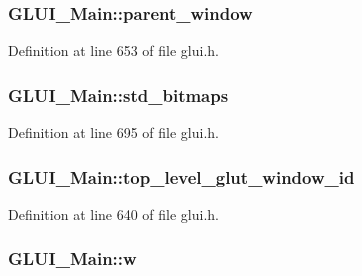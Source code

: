 \hypertarget{class_g_l_u_i___main_a70e6e1ec266281f272954fcc42f85087}{
\subsubsection[{parent\+\_\+window}]{ G\+L\+U\+I\+\_\+\+Main\+::parent\+\_\+window\hspace{0.3cm}{\ttfamily [protected]}}}\label{class_g_l_u_i___main_a70e6e1ec266281f272954fcc42f85087}


Definition at line 653 of file glui.\+h.

\hypertarget{class_g_l_u_i___main_adae87a2e684c2da03d2f8946913eb63d}{
\subsubsection[{std\+\_\+bitmaps}]{ G\+L\+U\+I\+\_\+\+Main\+::std\+\_\+bitmaps}}\label{class_g_l_u_i___main_adae87a2e684c2da03d2f8946913eb63d}


Definition at line 695 of file glui.\+h.

\hypertarget{class_g_l_u_i___main_afec9a40c9b4c139934236d094fcf81f6}{
\subsubsection[{top\+\_\+level\+\_\+glut\+\_\+window\+\_\+id}]{ G\+L\+U\+I\+\_\+\+Main\+::top\+\_\+level\+\_\+glut\+\_\+window\+\_\+id\hspace{0.3cm}{\ttfamily [protected]}}}\label{class_g_l_u_i___main_afec9a40c9b4c139934236d094fcf81f6}


Definition at line 640 of file glui.\+h.

\hypertarget{class_g_l_u_i___main_acee19f928a4837310f654431fda7cc1a}{
\subsubsection[{w}]{ G\+L\+U\+I\+\_\+\+Main\+::w\hspace{0.3cm}{\ttfamily [protected]}}}\label{class_g_l_u_i___main_acee19f928a4837310f654431fda7cc1a}


